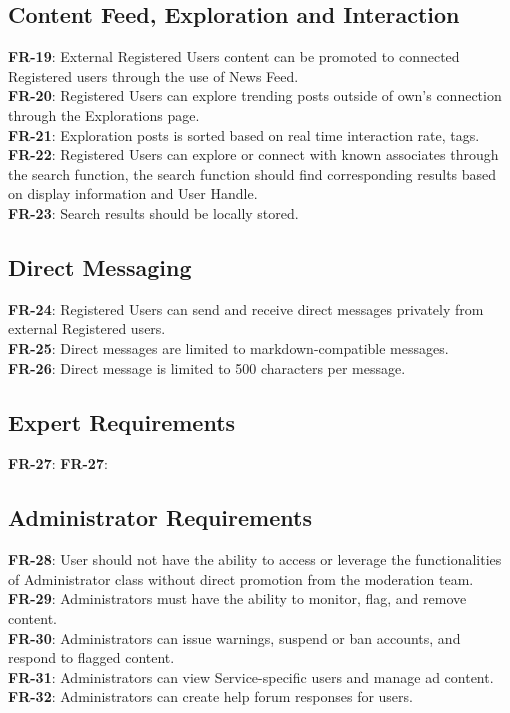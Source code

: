         \subsection{Content Feed, Exploration and Interaction}
        \textbf{FR-19}: External Registered Users content can be promoted to connected Registered users through the use of News Feed.
        \\
        \textbf{FR-20}: Registered Users can explore trending posts outside of own's connection through the Explorations page.
        \\
        \textbf{FR-21}: Exploration posts is sorted based on real time interaction rate, tags.
        \\
        \textbf{FR-22}: Registered Users can explore or connect with known associates through the search function, 
        the search function should find corresponding results based on display information and User Handle.
        \\
        \textbf{FR-23}: Search results should be locally stored.

        \subsection{Direct Messaging}
        \textbf{FR-24}: Registered Users can send and receive direct messages privately from external Registered users.
        \\
        \textbf{FR-25}: Direct messages are limited to markdown-compatible messages.
        \\
        \textbf{FR-26}: Direct message is limited to 500 characters per message.

        \subsection{Expert Requirements}
        \textbf{FR-27}: 
        \textbf{FR-27}:

        \subsection{Administrator Requirements}
        \textbf{FR-28}: User should not have the ability to access or leverage the functionalities of Administrator class without
        direct promotion from the moderation team.
        \\
        \textbf{FR-29}: Administrators must have the ability to monitor, flag, and remove content.
        \\
        \textbf{FR-30}: Administrators can issue warnings, suspend or ban accounts, and respond to flagged content.
        \\
        \textbf{FR-31}: Administrators can view Service-specific users and manage ad content.
        \\
        \textbf{FR-32}: Administrators can create help forum responses for users.

